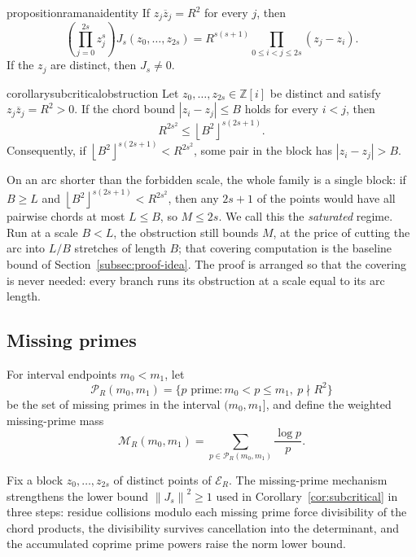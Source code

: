 \documentclass[11pt]{article}
\newcommand{\GI}{\mathbb Z[i]}
\newcommand{\Norm}[1]{\left\lVert#1\right\rVert^2}
\newcommand{\floor}[1]{\left\lfloor #1 \right\rfloor}
\newcommand{\conj}[1]{\overline{#1}}
\newcommand{\E}{\mathcal E}
\newcommand{\M}{\mathcal M}
\begin{document}
\begin{restatable}{proposition}{ramanaidentity}\label{prop:ramana}
If \(z_j\conj z_j=R^2\) for every \(j\), then
\[
  \left(\prod_{j=0}^{2s}z_j^s\right)J_s(z_0,\ldots,z_{2s})
  =
  R^{s(s+1)}\prod_{0\le i<j\le 2s}(z_j-z_i).
\]
If the \(z_j\) are distinct, then \(J_s\ne 0\).
\end{restatable}

\begin{restatable}{corollary}{subcriticalobstruction}\label{cor:subcritical}
Let \(z_0,\dots,z_{2s}\in\GI\) be distinct and satisfy \(z_j\conj z_j=R^2>0\).
If the chord bound \(|z_i-z_j|\le B\) holds for every \(i<j\), then
\[
  R^{2s^2}\le \floor{B^2}^{s(2s+1)}.
\]
Consequently, if \(\floor{B^2}^{s(2s+1)}<R^{2s^2}\), some pair in the block has \(|z_i-z_j|>B\).
\end{restatable}

On an arc shorter than the forbidden scale, the whole family is a single block: if \(B\ge L\) and \(\floor{B^2}^{s(2s+1)}<R^{2s^2}\), then any \(2s+1\) of the points would have all pairwise chords at most \(L\le B\), so \(M\le 2s\).
We call this the \emph{saturated} regime.
Run at a scale \(B<L\), the obstruction still bounds \(M\), at the price of cutting the arc into \(L/B\) stretches of length \(B\); that covering computation is the baseline bound of Section~\ref{subsec:proof-idea}.
The proof is arranged so that the covering is never needed: every branch runs its obstruction at a scale equal to its arc length.

\subsection{Missing primes}
\label{subsec:missing-primes}

For interval endpoints \(m_0<m_1\), let
\[
  \mathcal P_R(m_0,m_1)=\{p\text{ prime}:m_0<p\le m_1,\ p\nmid R^2\}
\]
be the set of missing primes in the interval \((m_0,m_1]\), and define the weighted missing-prime mass
\[
  \M_R(m_0,m_1)
  =
  \sum_{p\in\mathcal P_R(m_0,m_1)}\frac{\log p}{p}.
\]

Fix a block \(z_0,\dots,z_{2s}\) of distinct points of \(\E_R\).
The missing-prime mechanism strengthens the lower bound \(\Norm{J_s}\ge1\) used in Corollary~\ref{cor:subcritical} in three steps: residue collisions modulo each missing prime force divisibility of the chord products, the divisibility survives cancellation into the determinant, and the accumulated coprime prime powers raise the norm lower bound.
\end{document}
